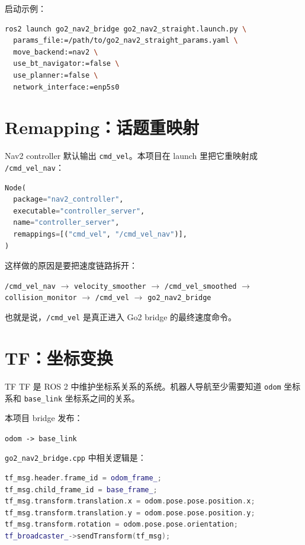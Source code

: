 \documentclass[UTF8,11pt,a4paper,openany]{ctexrep}
\newcommand{\code}[1]{\nolinkurl{#1}}
\newcommand{\file}[1]{\nolinkurl{#1}}
\newcommand{\topic}[1]{\nolinkurl{#1}}
\newcommand{\rosnode}[1]{\nolinkurl{#1}}
\begin{document}
启动示例：

\begin{lstlisting}[language=bash]
ros2 launch go2_nav2_bridge go2_nav2_straight.launch.py \
  params_file:=/path/to/go2_nav2_straight_params.yaml \
  move_backend:=nav2 \
  use_bt_navigator:=false \
  use_planner:=false \
  network_interface:=enp5s0
\end{lstlisting}

\section{Remapping：话题重映射}

Nav2 controller 默认输出 \topic{cmd_vel}。本项目在 launch 里把它重映射成 \topic{/cmd_vel_nav}：

\begin{lstlisting}[language=python]
Node(
  package="nav2_controller",
  executable="controller_server",
  name="controller_server",
  remappings=[("cmd_vel", "/cmd_vel_nav")],
)
\end{lstlisting}

这样做的原因是要把速度链路拆开：

\begin{center}
\topic{/cmd_vel_nav} \(\rightarrow\) \rosnode{velocity_smoother} \(\rightarrow\)
\topic{/cmd_vel_smoothed} \(\rightarrow\) \rosnode{collision_monitor} \(\rightarrow\)
\topic{/cmd_vel} \(\rightarrow\) \rosnode{go2_nav2_bridge}
\end{center}

也就是说，\topic{/cmd_vel} 是真正进入 Go2 bridge 的最终速度命令。

\section{TF：坐标变换}

\begin{termdef}{TF}
TF 是 ROS 2 中维护坐标系关系的系统。机器人导航至少需要知道 \code{odom} 坐标系和 \code{base_link} 坐标系之间的关系。
\end{termdef}

本项目 bridge 发布：

\begin{center}
  \code{odom -> base_link}
\end{center}

\file{go2_nav2_bridge.cpp} 中相关逻辑是：

\begin{lstlisting}[language=cpp]
tf_msg.header.frame_id = odom_frame_;
tf_msg.child_frame_id = base_frame_;
tf_msg.transform.translation.x = odom.pose.pose.position.x;
tf_msg.transform.translation.y = odom.pose.pose.position.y;
tf_msg.transform.rotation = odom.pose.pose.orientation;
tf_broadcaster_->sendTransform(tf_msg);
\end{lstlisting}
\end{document}
